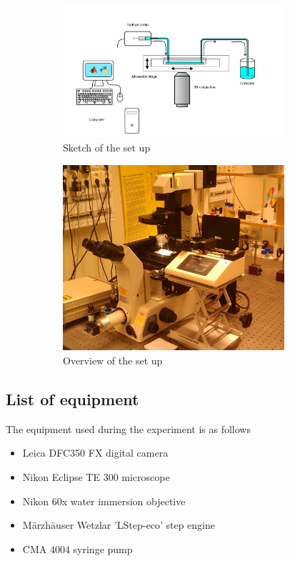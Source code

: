 \begin{figure}[H]
\centering
\begin{subfigure}[b]{0.45\textwidth}
\includegraphics[width=0.9\textwidth]{figures/method/setupsketch.png}
\caption{Sketch of the set up}\label{fig:setupsketch}
\end{subfigure}
\begin{subfigure}[b]{0.45\textwidth}
\includegraphics[width=0.9\textwidth]{figures/method/ExperimentalOverview.jpg}
\caption{Overview of the set up}\label{fig:setuppicture}
\end{subfigure}
\caption{}
\label{fig:experimentalsetup}
\end{figure}

\subsection{List of equipment}
The equipment used during the experiment is as follows
\begin{itemize}
\item Leica DFC350 FX digital camera 
\item Nikon Eclipse TE 300 microscope
\item Nikon 60x water immersion objective
\item Märzhäuser Wetzlar 'LStep-eco' step engine
\item CMA 4004 syringe pump
\end{itemize}


